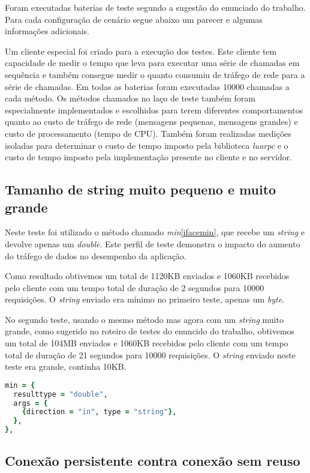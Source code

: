 \documentclass[11pt]{article}
\begin{document}
Foram executadas baterias de teste segundo a sugestão do enunciado do trabalho.
Para cada configuração de cenário segue abaixo um parecer e algumas informações
adicionais.

Um cliente especial foi criado para a execução dos testes. Este cliente tem
capacidade de medir o tempo que leva para executar uma série de chamadas em
sequência e também consegue medir o quanto consumiu de tráfego de rede para a
série de chamadas. Em todas as baterias foram executadas 10000 chamadas a cada
método. Os métodos chamados no laço de teste também foram especialmente
implementados e escolhidos para terem diferentes comportamentos quanto ao custo
de tráfego de rede (mensagens pequenas, mensagens grandes) e custo de
processamento (tempo de CPU). Também foram realizadas medições isoladas para
determinar o custo de tempo imposto pela biblioteca \textit{luarpc} e o custo
de tempo imposto pela implementação presente no cliente e no servidor.

\subsection{Tamanho de string muito pequeno e muito grande}\label{subsec:stringsize}

Neste teste foi utilizado o método chamado \textit{min}\ref{ifacemin}, que
recebe um \textit{string} e devolve apenas um \textit{double}. Este perfil de
teste demonstra o impacto do aumento do tráfego de dados no desempenho da
aplicação.

Como resultado obtivemos um total de 1120KB enviados e 1060KB recebidos pelo
cliente com um tempo total de duração de 2 segundos para 10000 requisições. O
\textit{string} enviado era mínimo no primeiro teste, apenas um \textit{byte}.

No segundo teste, usando o mesmo método mas agora com um \textit{string} muito
grande, como sugerido no roteiro de testes do enuncido do trabalho, obtivemos
um total de 104MB enviados e 1060KB recebidos pelo cliente com um tempo total
de duração de 21 segundos para 10000 requisições. O \textit{string} enviado
neste teste era grande, continha 10KB.

\begin{lstlisting}[label={ifacemin},language=Ruby,caption=Interface min]
min = {
  resulttype = "double",
  args = {
    {direction = "in", type = "string"},
  },
},
\end{lstlisting}

\subsection{Conexão persistente contra conexão sem reuso}\label{subsec:persist}
\end{document}
